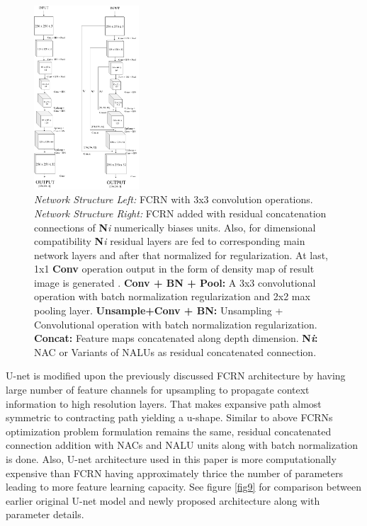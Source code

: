 \documentclass[conference]{IEEEtran}
\begin{document}
\begin{figure}[!h]
\centering
\includegraphics[width=0.35\textwidth]{assets/fcrn-nalu.png}
\caption{\textit{Network Structure Left: }FCRN with 3x3 convolution operations. \textit{Network Structure Right: } FCRN added with residual concatenation connections of \textbf{N}\textit{i} numerically biases units. Also, for dimensional compatibility \textbf{N}\textit{i} residual layers are fed to corresponding main network layers and after that normalized for regularization. At last, 1x1 \textbf{Conv} operation output in the form of density map of result image is generated .\newline
\textbf{Conv + BN + Pool: }A 3x3 convolutional operation with batch normalization regularization and  2x2 max pooling layer.\newline
\textbf{Unsample+Conv + BN: }Unsampling + Convolutional operation with batch normalization regularization.\newline
\textbf{Concat: }Feature maps concatenated along depth dimension.\newline
\textbf{N\textit{i}: }NAC or Variants of NALUs as residual concatenated connection.
}
\label{fig8}
\end{figure}

U-net is modified upon the previously discussed FCRN architecture by having large number of feature channels for upsampling to propagate context information to high resolution layers. That makes expansive path almost symmetric to contracting path yielding a u-shape. Similar to above FCRNs optimization problem formulation remains the same, residual concatenated connection addition with NACs and NALU units along with batch normalization is done. Also, U-net architecture used in this paper is more computationally expensive than FCRN having approximately thrice the number of parameters leading to more feature learning capacity. See figure \ref{fig9} for comparison between earlier original U-net model and newly proposed architecture along with parameter details.
\end{document}
